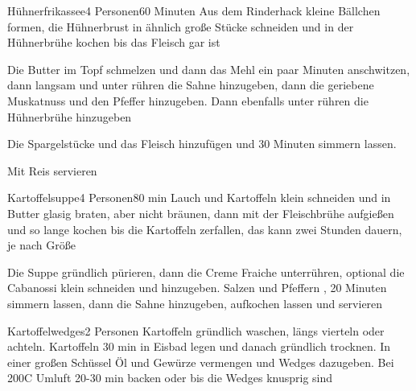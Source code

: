 
\begin{recipe}{Hühnerfrikassee}{4 Personen}{60 Minuten}
Aus dem Rinderhack kleine Bällchen formen, die Hühnerbrust in ähnlich große Stücke schneiden und in der Hühnerbrühe kochen bis das Fleisch gar ist

Die Butter im Topf schmelzen und dann das Mehl ein paar Minuten anschwitzen, dann langsam und unter rühren die Sahne hinzugeben, dann die geriebene Muskatnuss und den Pfeffer hinzugeben.
Dann ebenfalls unter rühren die Hühnerbrühe hinzugeben

Die Spargelstücke und das Fleisch hinzufügen und 30 Minuten simmern lassen.

Mit Reis servieren
\end{recipe}


\begin{recipe}{Kartoffelsuppe}{4 Personen}{80 min}
Lauch und Kartoffeln klein schneiden und in Butter glasig braten, aber nicht bräunen, dann mit der Fleischbrühe aufgießen und so lange kochen bis die Kartoffeln zerfallen, das kann zwei Stunden dauern, je nach Größe

Die Suppe gründlich pürieren, dann die Creme Fraiche unterrühren, optional die Cabanossi klein schneiden und hinzugeben. Salzen und Pfeffern , 20 Minuten simmern lassen, dann die Sahne hinzugeben, aufkochen lassen und servieren
\end{recipe}


\begin{recipe}{Kartoffelwedges}{2 Personen}{}
Kartoffeln gründlich waschen, längs vierteln oder achteln.
Kartoffeln 30 min in Eisbad legen und danach gründlich trocknen.
In einer großen Schüssel Öl und Gewürze vermengen und Wedges dazugeben.
Bei 200\0C Umluft 20-30 min backen oder bis die Wedges knusprig sind
\end{recipe}

